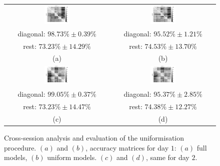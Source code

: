 \begin{figure}[!ht] \centering
  \begin{tabular}{cc}
    \includegraphics[width=0.25\textwidth]{figs/fig_resCross1_full.png} &
    \includegraphics[width=0.25\textwidth]{figs/fig_resCross1.png} \\
    diagonal: $98.73\% \pm 0.39\%$  & diagonal: $95.52\% \pm 1.21\%$ \\
        rest: $73.23\% \pm 14.29\%$ & rest: $74.53\% \pm 13.70\%$ \\
    (a) & (b) \\
    \includegraphics[width=0.25\textwidth]{figs/fig_resCross2_full.png} &
    \includegraphics[width=0.25\textwidth]{figs/fig_resCross2.png} \\
    diagonal: $99.05\% \pm 0.37\%$ & diagonal: $95.37\% \pm 2.85\%$ \\
        rest: $73.23\% \pm 14.47\%$ & rest: $74.38\% \pm 12.27\%$ \\
    (c) & (d) \\
  \end{tabular}
  \caption{Cross-session analysis and evaluation of the uniformisation
    procedure. $(a)$ and $(b)$, accuracy matrices for day $1$: $(a)$
    full models, $(b)$ uniform models. $(c)$ and $(d)$, same for day $2$.}
  \label{fig:cross_initial}
\end{figure}

